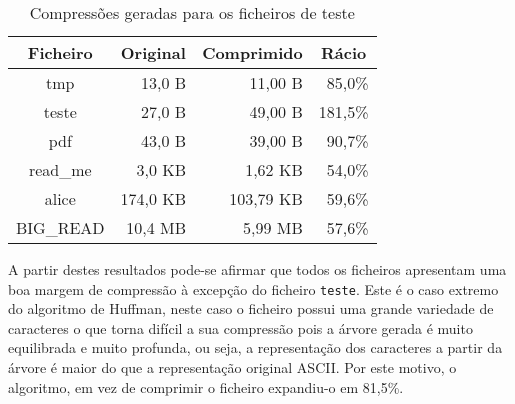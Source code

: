   \begin{table}[H]
    \centering
    \caption{Compressões geradas para os ficheiros de teste}
    \begin{tabular}{|c|r|r|r|}
        \hline
        \textbf{Ficheiro}                                 &
        \multicolumn{1}{c|}{\textbf{Original}}            &
        \multicolumn{1}{c|}{\textbf{Comprimido}}          &
        \multicolumn{1}{c|}{\textbf{Rácio}}\\ \hline \hline
        tmp        &  13,0  B    &  11,00 B          & 85,0\%     \\ \hline
        teste      &  27,0  B    &  49,00 B          & 181,5\%    \\ \hline
        pdf        &  43,0  B    &  39,00 B          & 90,7\%     \\ \hline
        read\_me   &  3,0  KB    &  1,62 KB          & 54,0\%     \\ \hline
        alice      &  174,0 KB   &  103,79 KB        & 59,6\%     \\ \hline
        BIG\_READ  &  10,4 MB    &  5,99 MB          & 57,6\%     \\
        \hline
    \end{tabular}
    \label{tab:compression}
  \end{table}

  A partir destes resultados pode-se afirmar que todos os ficheiros apresentam uma boa margem de compressão à excepção do ficheiro \texttt{teste}. Este é o caso extremo do algoritmo de Huffman, neste caso o ficheiro possui uma grande variedade de caracteres o que torna difícil a sua compressão pois a árvore gerada é muito equilibrada e muito profunda, ou seja, a representação dos caracteres a partir da árvore é maior do que a representação original ASCII. Por este motivo, o algoritmo, em vez de comprimir o ficheiro expandiu-o em 81,5\%.
